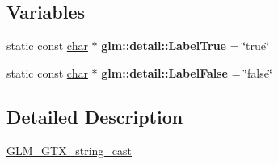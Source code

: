 \subsection*{Variables}
\begin{DoxyCompactItemize}
\item 
\mbox{\label{string__cast_8inl_acbf3b3879c4dca6a03fa14892e0beb85}} 
static const \hyperlink{classchar}{char} $\ast$ {\bfseries glm\+::detail\+::\+Label\+True} = \char`\"{}true\char`\"{}
\item 
\mbox{\label{string__cast_8inl_a9af06cfdb4ef874dc5c30348835bc549}} 
static const \hyperlink{classchar}{char} $\ast$ {\bfseries glm\+::detail\+::\+Label\+False} = \char`\"{}false\char`\"{}
\end{DoxyCompactItemize}


\subsection{Detailed Description}
\hyperlink{group__gtx__string__cast}{G\+L\+M\+\_\+\+G\+T\+X\+\_\+string\+\_\+cast} 